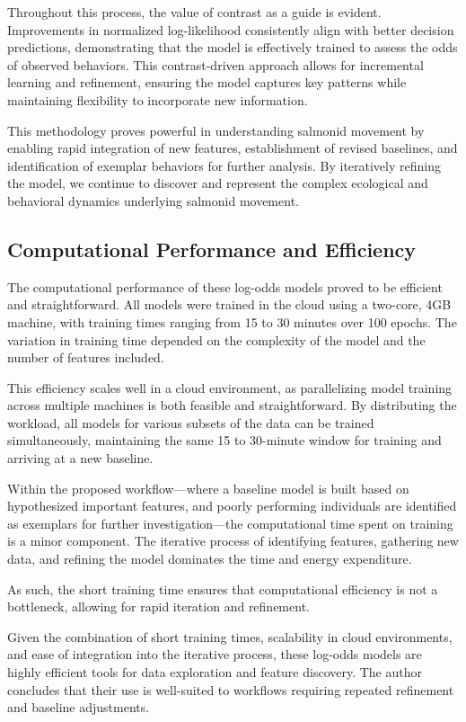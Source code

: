 \documentclass[11pt]{article}
\begin{document}
Throughout this process, the value of contrast as a guide is evident. Improvements in normalized log-likelihood consistently align with better decision predictions, demonstrating that the model is effectively trained to assess the odds of observed behaviors. This contrast-driven approach allows for incremental learning and refinement, ensuring the model captures key patterns while maintaining flexibility to incorporate new information.


This methodology proves powerful in understanding salmonid movement by enabling rapid integration of new features, establishment of revised baselines, and identification of exemplar behaviors for further analysis. By iteratively refining the model, we continue to discover and represent the complex ecological and behavioral dynamics underlying salmonid movement.

\subsection*{Computational Performance and Efficiency}
The computational performance of these log-odds models proved to be efficient and straightforward. All models were trained in the cloud using a two-core, 4GB machine, with training times ranging from 15 to 30 minutes over 100 epochs. The variation in training time depended on the complexity of the model and the number of features included.

This efficiency scales well in a cloud environment, as parallelizing model training across multiple machines is both feasible and straightforward. By distributing the workload, all models for various subsets of the data can be trained simultaneously, maintaining the same 15 to 30-minute window for training and arriving at a new baseline.

Within the proposed workflow—where a baseline model is built based on hypothesized important features, and poorly performing individuals are identified as exemplars for further investigation—the computational time spent on training is a minor component. The iterative process of identifying features, gathering new data, and refining the model dominates the time and energy expenditure.

As such, the short training time ensures that computational efficiency is not a bottleneck, allowing for rapid iteration and refinement.

Given the combination of short training times, scalability in cloud environments, and ease of integration into the iterative process, these log-odds models are highly efficient tools for data exploration and feature discovery. The author concludes that their use is well-suited to workflows requiring repeated refinement and baseline adjustments.
\end{document}
